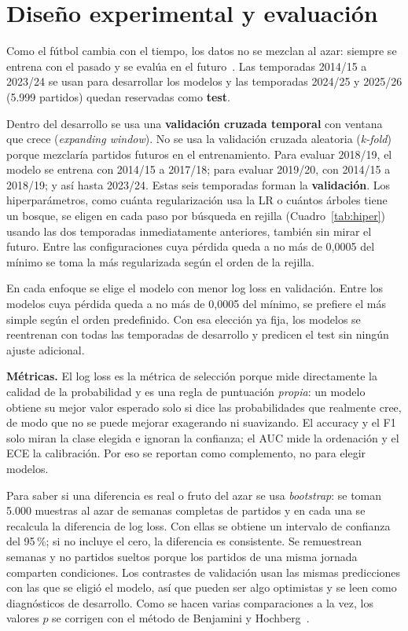 \documentclass[conference]{IEEEtran}
\begin{document}
\section{Diseño experimental y evaluación}
\label{sec:diseno}
Como el fútbol cambia con el tiempo, los datos no se mezclan al azar: siempre se entrena con el pasado y se evalúa en el futuro~\cite{james2023}. Las temporadas 2014/15 a 2023/24 se usan para desarrollar los modelos y las temporadas 2024/25 y 2025/26 (5.999 partidos) quedan reservadas como \textbf{test}.

Dentro del desarrollo se usa una \textbf{validación cruzada temporal} con ventana que crece (\emph{expanding window}). No se usa la validación cruzada aleatoria (\emph{k-fold}) porque mezclaría partidos futuros en el entrenamiento. Para evaluar 2018/19, el modelo se entrena con 2014/15 a 2017/18; para evaluar 2019/20, con 2014/15 a 2018/19; y así hasta 2023/24. Estas seis temporadas forman la \textbf{validación}. Los hiperparámetros, como cuánta regularización usa la LR o cuántos árboles tiene un bosque, se eligen en cada paso por búsqueda en rejilla (Cuadro~\ref{tab:hiper}) usando las dos temporadas inmediatamente anteriores, también sin mirar el futuro. Entre las configuraciones cuya pérdida queda a no más de 0,0005 del mínimo se toma la más regularizada según el orden de la rejilla.

En cada enfoque se elige el modelo con menor log loss en validación. Entre los modelos cuya pérdida queda a no más de 0,0005 del mínimo, se prefiere el más simple según el orden predefinido. Con esa elección ya fija, los modelos se reentrenan con todas las temporadas de desarrollo y predicen el test sin ningún ajuste adicional.

\textbf{Métricas.} El log loss es la métrica de selección porque mide directamente la calidad de la probabilidad y es una regla de puntuación \emph{propia}: un modelo obtiene su mejor valor esperado solo si dice las probabilidades que realmente cree, de modo que no se puede mejorar exagerando ni suavizando. El accuracy y el F1 solo miran la clase elegida e ignoran la confianza; el AUC mide la ordenación y el ECE la calibración. Por eso se reportan como complemento, no para elegir modelos.

Para saber si una diferencia es real o fruto del azar se usa \emph{bootstrap}: se toman 5.000 muestras al azar de semanas completas de partidos y en cada una se recalcula la diferencia de log loss. Con ellas se obtiene un intervalo de confianza del 95\,\%; si no incluye el cero, la diferencia es consistente. Se remuestrean semanas y no partidos sueltos porque los partidos de una misma jornada comparten condiciones. Los contrastes de validación usan las mismas predicciones con las que se eligió el modelo, así que pueden ser algo optimistas y se leen como diagnósticos de desarrollo. Como se hacen varias comparaciones a la vez, los valores $p$ se corrigen con el método de Benjamini y Hochberg~\cite{benjamini1995}.
\end{document}
